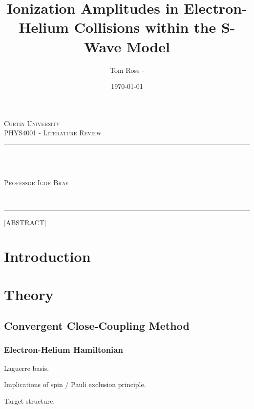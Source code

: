 \documentclass[draft]{article}
\title{Ionization Amplitudes in Electron-Helium Collisions within the S-Wave
  Model}
\author{Tom Ross - \thestudentid}
\date{\today}
\gdef\theassessment{PHYS4001 - Literature Review}
\gdef\thesupervisor{Professor Igor Bray}
\gdef\theinstitution{Curtin University}
\begin{document}

\begin{titlepage}
  {
    \centering
    {
      \scshape\large\theinstitution
      ~\\
      \scshape\large\theassessment
      \par
    }
    \vspace{1 em}
    \hrule
    ~\\
    {
      \scshape\huge\thetitle
      \par
    }
    \vspace{1 em}
    {
      \scshape\large
      {
        \theauthor
        ~\\
        \thesupervisor
      }
      \par
    }
    ~\\
    \hrule
  }
  \vspace{2 em}
  {
    [ABSTRACT]
  }
\end{titlepage}

\clearpage


\tableofcontents
\listoffigures

\listoftables


\clearpage

\section{Introduction}
\label{sec:introduction}

\section{Theory}
\label{sec:theory}

\subsection{Convergent Close-Coupling Method}
\label{sec:ccc-method}

\subsubsection{Electron-Helium Hamiltonian}
\label{sec:electron-helium-hamiltonian}

Laguerre basis.

Implications of spin / Pauli exclusion principle.

Target structure.
\end{document}
